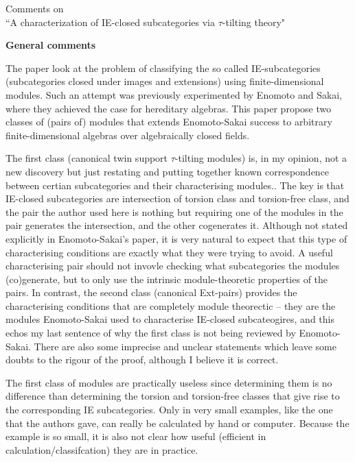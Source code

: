 \documentclass[a4,11pt]{article}
\begin{document}


\begin{center}
	{\LARGE 
Comments on\\
``A characterization of IE-closed subcategories via $\tau$-tilting theory"
}
\end{center}

{\bf General comments}

The paper look at the problem of classifying the so called IE-subcategories (subcategories closed under images and extensions) using finite-dimensional modules.  
Such an attempt was previously experimented by Enomoto and Sakai, where they achieved the case for hereditary algebras.
This paper propose two classes of (pairs of) modules that extends Enomoto-Sakai success to arbitrary finite-dimensional algebras over algebraically closed fields.

The first class (canonical twin support $\tau$-tilting modules) is, in my opinion, not a new discovery but just restating and putting together known correspondence between certian subcategories and their characterising modules..  The key is that IE-closed subcategories are intersection of torsion class and torsion-free class, and the pair the author used here is nothing but requiring one of the modules in the pair generates the intersection, and the other cogenerates it.  Although not stated explicitly in Enomoto-Sakai's paper, it is very natural to expect that this type of characterising conditions are exactly what they were trying to avoid.  A useful characterising pair should not invovle checking what subcategories the modules (co)generate, but to only use the intrinsic module-theoretic properties of the pairs.
In contrast, the second class (canonical Ext-pairs) provides the characterising conditions that are completely module theorectic -- they are the modules Enomoto-Sakai used to characterise IE-closed subcateogires, and this echos my last sentence of why the first class is not being reviewed by Enomoto-Sakai.
There are also some imprecise and unclear statements which leave some doubts to the rigour of the proof, although I believe it is correct.

The first class of modules are practically useless since determining them is no difference than determining the torsion and torsion-free classes that give rise to the corresponding IE subcategories.  Only in very small examples, like the one that the authors gave, can really be calculated by hand or computer.  Because the example is so small, it is also not clear how useful (efficient in calculation/classifcation) they are in practice.  
\end{document}
